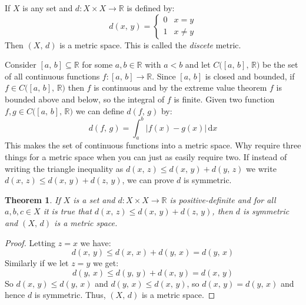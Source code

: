 \documentclass{article}
\theoremstyle{plain}
\newtheorem{theorem}{Theorem}[section]
\theoremstyle{normal}
\newenvironment{example}{%
    \pushQED{\qed}\renewcommand{\qedsymbol}{$\blacksquare$}\examplex%
}{%
    \popQED\endexamplex%
}
\begin{document}
        \begin{example}
            If $X$ is any set and $d:X\times{X}\rightarrow\mathbb{R}$ is defined
            by:
            \begin{equation}
                d(x,\,y)=
                \begin{cases}
                    0&x=y\\
                    1&x\ne{y}
                \end{cases}
            \end{equation}
            Then $(X,\,d)$ is a metric space. This is called the
            \textit{discete} metric.
        \end{example}
        \begin{example}
            Consider $[a,\,b]\subseteq\mathbb{R}$ for some $a,b\in\mathbb{R}$
            with $a<b$ and let $C\big([a,\,b],\,\mathbb{R}\big)$ be the set of
            all continuous functions $f:[a,\,b]\rightarrow\mathbb{R}$. Since
            $[a,\,b]$ is closed and bounded, if
            $f\in{C}\big([a,\,b],\,\mathbb{R}\big)$ then $f$ is continuous and
            by the extreme value theorem $f$ is bounded above and below, so the
            integral of $f$ is finite. Given two function
            $f,g\in{C}\big([a,\,b],\,\mathbb{R}\big)$ we can define
            $d(f,\,g)$ by:
            \begin{equation}
                d(f,\,g)=\int_{a}^{b}|f(x)-g(x)|\,\textrm{d}x
            \end{equation}
            This makes the set of continuous functions into a metric space.
        \end{example}
        Why require three things for a metric space when you can just as
        easily require two. If instead of writing the triangle inequality
        as $d(x,\,z)\leq{d}(x,\,y)+d(y,\,z)$ we write
        $d(x,\,z)\leq{d}(x,\,y)+d(z,\,y)$, we can prove $d$ is symmetric.
        \begin{theorem}
            If $X$ is a set and $d:X\times{X}\rightarrow\mathbb{R}$ is
            positive-definite and for all
            $a,b,c\in{X}$ it is true that
            $d(x,\,z)\leq{d}(x,\,y)+d(z,\,y)$, then $d$ is symmetric and
            $(X,\,d)$ is a metric space.
        \end{theorem}
        \begin{proof}
            Letting $z=x$ we have:
            \begin{equation}
                d(x,\,y)\leq{d}(x,\,x)+d(y,\,x)=d(y,\,x)
            \end{equation}
            Similarly if we let $z=y$ we get:
            \begin{equation}
                d(y,\,x)\leq{d}(y,\,y)+d(x,\,y)=d(x,\,y)
            \end{equation}
            So $d(x,\,y)\leq{d}(y,\,x)$ and $d(y,\,x)\leq{d}(x,\,y)$, so
            $d(x,\,y)=d(y,\,x)$ and hence
            $d$ is symmetric. Thus, $(X,\,d)$ is a metric space.
        \end{proof}
\end{document}
